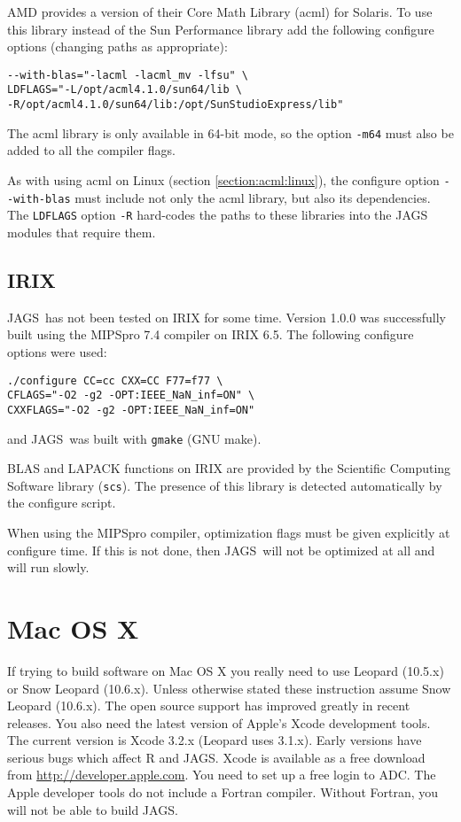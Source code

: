 \documentclass[11pt, a4paper, titlepage]{article}
\newcommand{\JAGS}{\textsf{JAGS}}
\begin{document}
AMD provides a version of their Core Math Library (acml) for
Solaris. To use this library instead of the Sun Performance library
add the following configure options (changing paths as appropriate):
\begin{verbatim}
--with-blas="-lacml -lacml_mv -lfsu" \
LDFLAGS="-L/opt/acml4.1.0/sun64/lib \
-R/opt/acml4.1.0/sun64/lib:/opt/SunStudioExpress/lib"
\end{verbatim}
The acml library is only available in 64-bit mode, so the option
\verb+-m64+ must also be added to all the compiler flags.

As with using acml on Linux (section \ref{section:acml:linux}), the
configure option \verb+--with-blas+ must include not only the acml
library, but also its dependencies. The \verb+LDFLAGS+ option \verb+-R+
hard-codes the paths to these libraries into the JAGS modules that
require them.

\subsection{IRIX}

\JAGS\ has not been tested on IRIX for some time.  Version 1.0.0 was
successfully built using the MIPSpro 7.4 compiler on IRIX 6.5. The
following configure options were used:
\begin{verbatim}
./configure CC=cc CXX=CC F77=f77 \
CFLAGS="-O2 -g2 -OPT:IEEE_NaN_inf=ON" \
CXXFLAGS="-O2 -g2 -OPT:IEEE_NaN_inf=ON" 
\end{verbatim}
and \JAGS\ was built with \verb+gmake+ (GNU make).

BLAS and LAPACK functions on IRIX are provided by the Scientific
Computing Software library (\verb+scs+). The presence of this library
is detected automatically by the configure script.

When using the MIPSpro compiler, optimization flags must be given
explicitly at configure time. If this is not done, then \JAGS\ will
not be optimized at all and will run slowly.

\clearpage
\section{Mac OS X}

If trying to build software on Mac OS X you really need to use Leopard
(10.5.x) or Snow Leopard (10.6.x). Unless otherwise stated these
instruction assume Snow Leopard (10.6.x). The open source support has
improved greatly in recent releases. You also need the latest version
of Apple's Xcode development tools. The current version is Xcode 3.2.x
(Leopard uses 3.1.x).  Early versions have serious bugs which affect R
and \JAGS.  Xcode is available as a free download from
\url{http://developer.apple.com}. You need to set up a free login to
ADC. The Apple developer tools do not include a Fortran
compiler. Without Fortran, you will not be able to build \JAGS.
\end{document}
